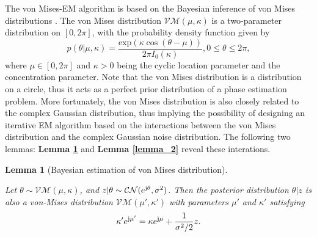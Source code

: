 \documentclass[12pt,draftclsnofoot,journal,onecolumn]{IEEEtran}
\newtheorem{lemma}{\bf Lemma}
\theoremstyle{nonumberplain}
\def \exp {\text{exp}}
\def \CN {\mathcal{CN}}
\def \VM {\mathcal{VM}}
\begin{document}
    The von Mises-EM algorithm is based on the Bayesian inference of von Mises distributions \cite{mardia1976bayesian}. The von Mises distribution $\VM(\mu, \kappa)$ is a two-parameter distribution on $[0, 2\pi]$, with the probability density function given by 
    \begin{equation}
        p(\theta|\mu, \kappa) = \frac{\exp(\kappa \cos(\theta - \mu))}{2\pi I_0(\kappa)}, 0\leq \theta \leq 2\pi,
    \end{equation}
    where $\mu \in [0,2\pi]$ and $\kappa >0$ being the cyclic location parameter and the concentration parameter. 
    Note that the von Mises distribution is a distribution on a circle, thus it acts as a perfect prior distribution of a phase estimation problem. 
    More fortunately, the von Mises distribution is also closely related to the complex Gaussian distribution, thus implying the possibility of designing an iterative EM algorithm \cite{casella2021statistical} based on the interactions between the von Mises distribution and the complex Gaussian noise distribution. The following two lemmas: {\bf Lemma \ref{lemma_1}} and {\bf Lemma \ref{lemma_2}} reveal these interations. 
    \begin{lemma}[Bayesian estimation of von Mises distribution]\label{lemma_1} \mbox{}\par
        Let $\theta \sim \VM(\mu, \kappa)$, and $z|\theta \sim \CN(e^{{\rm j}\theta}, \sigma^2)$. Then the posterior distribution $\theta | z$ is also a von-Mises distribution $\VM(\mu', \kappa')$ with parameters $\mu'$ and $\kappa'$ satisfying
        \begin{equation}
            \kappa' e^{{\rm j}\mu'} = \kappa e^{{\rm j}\mu} + \frac{1}{\sigma^2/2}z.
        \end{equation}
    \end{lemma}
\end{document}
